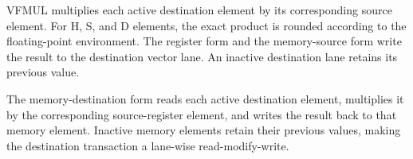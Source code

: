 VFMUL multiplies each active destination element by its corresponding source
element. For H, S, and D elements, the exact product is rounded according to
the floating-point environment. The register form and the memory-source form
write the result to the destination vector lane. An inactive destination lane
retains its previous value.

The memory-destination form reads each active destination element, multiplies
it by the corresponding source-register element, and writes the result back
to that memory element. Inactive memory elements retain their previous values,
making the destination transaction a lane-wise read-modify-write.
